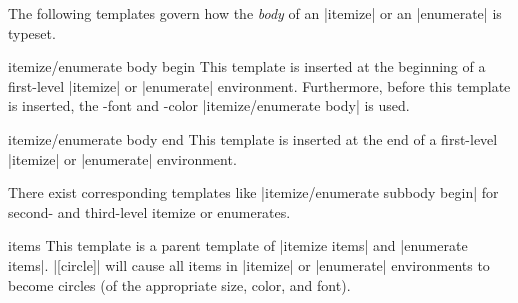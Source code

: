 The following templates govern how the \emph{body} of an |itemize| or an |enumerate| is typeset.
\begin{element}{itemize/enumerate body begin}\yes\no\no
  This template is inserted at the beginning of a first-level |itemize| or |enumerate| environment. Furthermore, before this template is inserted, the \beamer-font and -color |itemize/enumerate body| is used.
\end{element}
\begin{element}{itemize/enumerate body end}\yes\no\no
  This template is inserted at the end of a first-level |itemize| or |enumerate| environment.
\end{element}
There exist corresponding templates like |itemize/enumerate subbody begin| for second- and third-level itemize or enumerates.

\begin{element}{items}\semiyes\no\no
  This template is a parent template of |itemize items| and |enumerate items|.
  \example
  |[circle]| will cause all items in |itemize| or |enumerate| environments to become circles (of the appropriate size, color, and font).
\end{element}

\label{section-descriptions}

